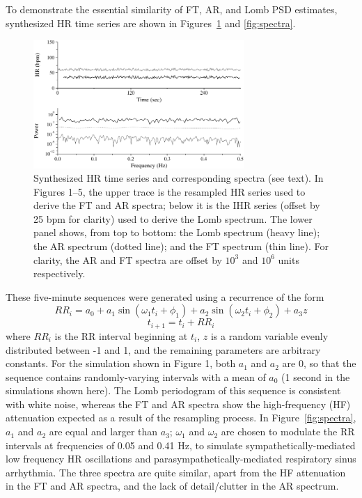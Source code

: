 \documentclass[twocolumn]{cinc}
\begin{document}
To demonstrate the essential similarity of FT, AR, and Lomb PSD estimates,
synthesized HR time series are shown in Figures~\ref{fig:timeseries} and
\ref{fig:spectra}.

\begin{figure}
\centerline{\includegraphics[width=8cm] {figures/fig1}}
  \caption{\label{fig:timeseries} Synthesized HR time series and corresponding spectra (see text).
    In Figures 1--5, the upper trace is the resampled HR series used to
    derive the FT and AR spectra; below it is the IHR series (offset by 25
    bpm for clarity) used to derive the Lomb spectrum.  The lower panel
    shows, from top to bottom: the Lomb spectrum (heavy line); the AR
    spectrum (dotted line); and the FT spectrum (thin line).  For clarity,
    the AR and FT spectra are offset by $10^{3}$ and $10^{6}$ units
    respectively.}
\end{figure}

These five-minute sequences were generated using a recurrence of the form
\begin{equation}
RR_{i} = a_{0} + a_{1} \sin ( {\omega_{1} t_{i} + \phi_{1}} ) +
 a_{2} \sin ( {\omega_{2} t_{i} + \phi_{2}} ) + a_{3} z
\end{equation}
\begin{equation}
t_{i+1} = t_{i} + RR_{i}
\end{equation}
where $RR_{i}$ is the RR interval beginning at $t_{i}$, $z$ is a random
variable evenly distributed between -1 and 1, and the remaining parameters
are arbitrary constants.  For the simulation shown in Figure 1, both
$a_{1}$ and $a_{2}$ are 0, so that the sequence contains randomly-varying
intervals with a mean of $a_0$ (1 second in the simulations shown here).
The Lomb periodogram of this sequence is consistent with white noise,
whereas the FT and AR spectra show the high-frequency (HF) attenuation
expected as a result of the resampling process.  In
Figure~\ref{fig:spectra}, $a_{1}$ and $a_{2}$ are equal and larger than
$a_{3}$; $\omega_{1}$ and $\omega_{2}$ are chosen to modulate the RR
intervals at frequencies of 0.05 and 0.41 Hz, to simulate
sympathetically-mediated low frequency HR oscillations and
parasympathetically-mediated respiratory sinus arrhythmia.  The three
spectra are quite similar, apart from the HF attenuation in the FT and AR
spectra, and the lack of detail/clutter in the AR spectrum.
\end{document}
